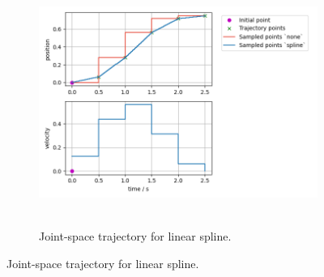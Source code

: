 \begin{figure}[t]
 \begin{subfigure}{1.0\textwidth}
 \begin{center}
  \includegraphics[height=80mm]{./fig/ros2_control/jtc/spline_position.png}
\caption{Joint-space trajectory for linear spline.}\label{linear int}
 \end{center}
 \end{subfigure}
 

\end{figure}
